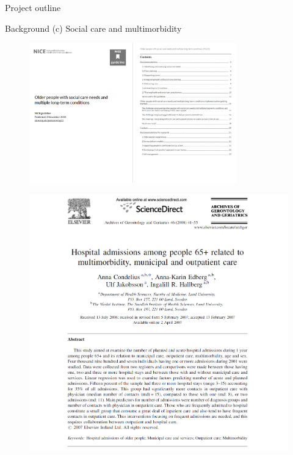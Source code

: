 \documentclass[ignorenonframetext,]{beamer}
\begin{document}
\begin{frame}{Project outline}

\begin{block}{Background (c) Social care and multimorbidity}

\begin{figure}
\centerline{\includegraphics[width=0.8\textwidth, height=0.6\textheight]{images/NICE.png}}
\end{figure}

\end{block}

\end{frame}

\begin{frame}{}

\begin{figure}
\centerline{\includegraphics[width=\textwidth,height=0.8\textheight,keepaspectratio]{images/Condelius.PNG}}
\end{figure}

\end{frame}
\end{document}
